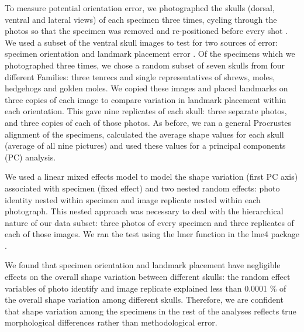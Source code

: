 \documentclass[12pt,a4paper]{article}
\begin{document}
	
	To measure potential orientation error, we photographed the skulls (dorsal, ventral and lateral views) of each specimen three times, cycling through the photos so that the specimen was removed and re-positioned before every shot \citep{Viscosi2011}.
	We used a subset of the ventral skull images to test for two sources of error: specimen orientation and landmark placement error \citep{Arnqvist1998, Barrow2008}. Of the specimens which we photographed three times, we chose a random subset of seven skulls from four different Families: three tenrecs and single representatives of shrews, moles, hedgehogs and golden moles. We copied these images and placed landmarks on three copies of each image to compare variation in landmark placement within each orientation. This gave nine replicates of each skull: three separate photos, and three copies of each of those photos. As before, we ran a general Procrustes alignment \citep{Rohlf1993} of the specimens, calculated the average shape values for each skull (average of all nine pictures) and used these values for a principal components (PC) analysis.
		
	We used a linear mixed effects model to model the shape variation (first PC axis) associated with specimen (fixed effect) and two nested random effects: photo identity nested within specimen and image replicate nested within each photograph. This nested approach was necessary to deal with the hierarchical nature of our data subset: three photos of every specimen and three replicates of each of those images. We ran the test using the lmer function in the lme4 package \citep{Bates2014}.  

	We found that specimen orientation and landmark placement have negligible effects on the overall shape variation between different skulls: the random effect variables of photo identify and image replicate explained less than 0.0001 \% of the overall shape variation among different skulls. Therefore, we are confident that shape variation among the specimens in the rest of the analyses reflects true morphological differences rather than methodological error.


 
 
\end{document}
